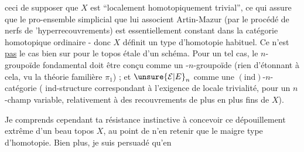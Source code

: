 ceci de supposer que $X$ est ``localement homotopiquement trivial'', ce qui assure que le pro-ensemble simplicial que lui associent Artin-Mazur (par le procédé de nerfs de 'hyperrecouvrements) est essentiellement constant dans la catégorie homotopique ordinaire - donc $X$ définit un type d'homotopie habituel. Ce n'est \uline{pas} le cas bien sur pour le topos étale d'un schéma. Pour un tel cas, le $n$-groupoïde fondamental doit être conçu comme un -$n$-groupoïde (rien d'étonnant à cela, vu la théorie familière  $\pi_1$) ; et $\unsure{\mathcal E|E}_n$ comme une $(\mathrm{ind})$-$n$-catégorie ( ind-structure correspondant à l'exigence de locale trivialité, pour un $n$-champ variable, relativement à des recouvrements de plus en plus fins de $X$).


Je comprends cependant ta résistance instinctive à concevoir ce dépouillement extrême d'un beau topos $X$, au point de%
n'en retenir que le maigre type d'homotopie. Bien plus, je suis persuadé qu'en%
